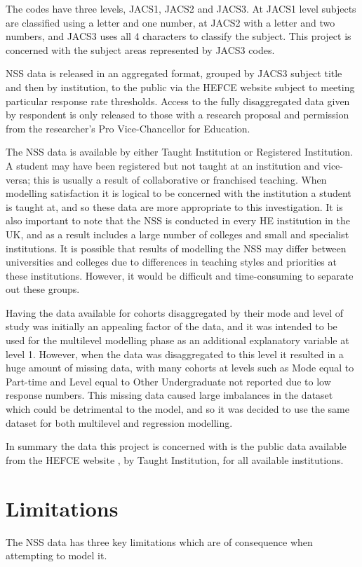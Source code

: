 \documentclass[11pt,a4paper]{report}
\begin{document}
The codes have three levels, JACS1, JACS2 and JACS3. At JACS1 level subjects are classified using a letter and one number, at JACS2 with a letter and two numbers, and JACS3 uses all 4 characters to classify the subject. This project is concerned with the subject areas represented by JACS3 codes. 

\ac{NSS} data is released in an aggregated format, grouped by JACS3 subject title and then by institution, to the public via the HEFCE website subject to meeting particular response rate thresholds. Access to the fully disaggregated data given by respondent is only released to those with a research proposal and permission from the researcher's Pro Vice-Chancellor for Education. 

The NSS data is available by either Taught Institution or Registered Institution. A student may have been registered but not taught at an institution and vice-versa; this is usually a result of collaborative or franchised teaching. When modelling satisfaction it is logical to be concerned with the institution a student is taught at, and so these data are more appropriate to this investigation. It is also important to note that the NSS is conducted in every \ac{HE} institution in the UK, and as a result includes a large number of colleges and small and specialist institutions. It is possible that results of modelling the NSS may differ between universities and colleges due to differences in teaching styles and priorities at these institutions. However, it would be difficult and time-consuming to separate out these groups. 

Having the data available for cohorts disaggregated by their mode and level of study was initially an appealing factor of the data, and it was intended to be used for the multilevel modelling phase as an additional explanatory variable at level 1. However, when the data was disaggregated to this level it resulted in a huge amount of missing data, with many cohorts at levels such as Mode equal to Part-time and Level equal to Other Undergraduate not reported due to low response numbers. This missing data caused large imbalances in the dataset which could be detrimental to the model, and so it was decided to use the same dataset for both multilevel and regression modelling. 

In summary the data this project is concerned with is the public data available from the \ac{HEFCE} website \cite{HEFCEdata}, by Taught Institution, for all available institutions.

\section{Limitations} \label{limitations}
The \ac{NSS} data has three key limitations which are of consequence when attempting to model it. 
\end{document}
